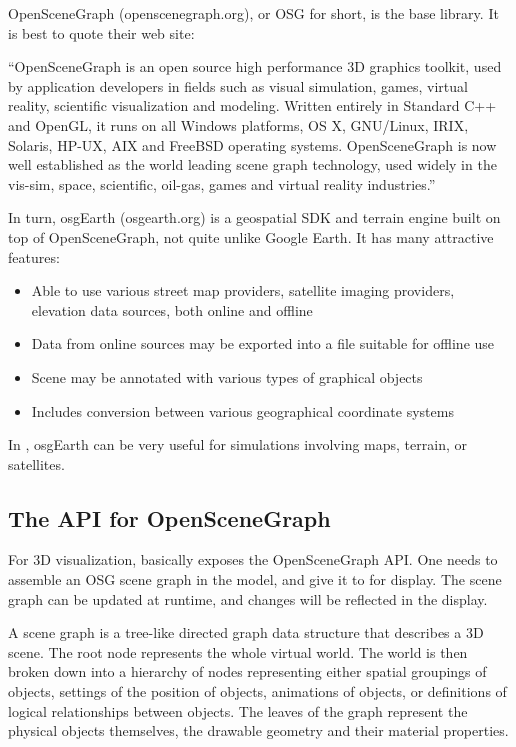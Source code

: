 OpenSceneGraph (openscenegraph.org), or OSG for short, is the base library.
It is best to quote their web site:

\begin{displayquote}
``OpenSceneGraph is an open source high performance 3D graphics toolkit,
used by application developers in fields such as visual simulation, games,
virtual reality, scientific visualization and modeling. Written entirely in
Standard C++ and OpenGL, it runs on all Windows platforms, OS X, GNU/Linux,
IRIX, Solaris, HP-UX, AIX and FreeBSD operating systems. OpenSceneGraph is
now well established as the world leading scene graph technology, used
widely in the vis-sim, space, scientific, oil-gas, games and virtual
reality industries.''
\end{displayquote}

In turn, osgEarth (osgearth.org) is a geospatial SDK and terrain engine built on top
of OpenSceneGraph, not quite unlike Google Earth. It has many attractive features:

\begin{itemize}
\item Able to use various street map providers, satellite imaging providers,
      elevation data sources, both online and offline
\item Data from online sources may be exported into a file suitable for offline use
\item Scene may be annotated with various types of graphical objects
\item Includes conversion between various geographical coordinate systems
\end{itemize}

In \opp, osgEarth can be very useful for simulations involving maps, terrain,
or satellites.

\subsection{The {\opp} API for OpenSceneGraph}
\label{sec:graphics:opp-api-for-osg}

For 3D visualization, {\opp} basically exposes the OpenSceneGraph API. One
needs to assemble an OSG scene graph in the model, and give it to {\opp}
for display. The scene graph can be updated at runtime, and changes will be
reflected in the display.

\begin{note}
 A scene graph is a tree-like directed graph
data structure that describes a 3D scene. The root node represents the
whole virtual world. The world is then broken down into a hierarchy of
nodes representing either spatial groupings of objects, settings of
the position of objects, animations of objects, or definitions of
logical relationships between objects. The leaves of the graph
represent the physical objects themselves, the drawable geometry and
their material properties.
\end{note}

